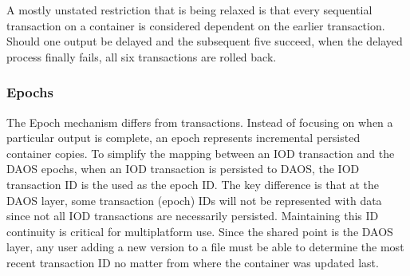 \documentclass{sig-alt-gov2}
\begin{document}

A mostly unstated restriction that is
being relaxed is that every sequential transaction on a container is considered
dependent on the earlier transaction. Should one output be delayed and the
subsequent five succeed, when the delayed process finally fails, all six
transactions are rolled back.

\subsubsection{Epochs}
The Epoch mechanism differs from transactions. Instead of focusing on when a
particular output is complete, an epoch represents incremental persisted
container copies.  To simplify the mapping between an IOD transaction and the
DAOS epochs, when an IOD transaction is persisted to DAOS, the IOD transaction
ID is the used as the epoch ID. The key difference is that at the DAOS layer,
some transaction (epoch) IDs will not be represented with data since not all
IOD transactions are necessarily persisted. Maintaining this ID continuity is
critical for multiplatform use. Since the shared point is the DAOS layer, any
user adding a new version to a file must be able to determine the most recent
transaction ID no matter from where the container was updated last.
\end{document}

